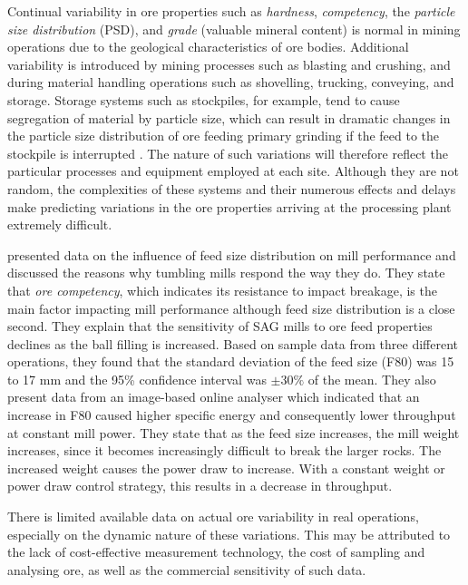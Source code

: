 Continual variability in ore properties such as \textit{hardness}, \textit{competency}, the \textit{particle size distribution} (PSD), and \textit{grade} (valuable mineral content) is normal in mining operations due to the geological characteristics of ore bodies. Additional variability is introduced by mining processes such as blasting and crushing, and during material handling operations such as shovelling, trucking, conveying, and storage. Storage systems such as stockpiles, for example, tend to cause segregation of material by particle size, which can result in dramatic changes in the particle size distribution of ore feeding primary grinding if the feed to the stockpile is interrupted \citep{estrada_hybrid_2014}. The nature of such variations will therefore reflect the particular processes and equipment employed at each site. Although they are not random, the complexities of these systems and their numerous effects and delays make predicting variations in the ore properties arriving at the processing plant extremely difficult.

\cite{morrell_influence_2001} presented data on the influence of feed size distribution on mill performance and discussed the reasons why tumbling mills respond the way they do. They state that \textit{ore competency}, which indicates its resistance to impact breakage, is the main factor impacting mill performance although feed size distribution is a close second. They explain that the sensitivity of \gls{SAG} mills to ore feed properties declines as the ball filling is increased. Based on sample data from three different operations, they found that the standard deviation of the feed size (F80) was 15 to 17 mm and the 95\% confidence interval was $\pm30\text{\%}$ of the mean. They also present data from an image-based online analyser which indicated that an increase in F80 caused higher specific energy and consequently lower throughput at constant mill power. They state that as the feed size increases, the mill weight increases, since it becomes increasingly difficult to break the larger rocks. The increased weight causes the power draw to increase. With a constant weight or power draw control strategy, this results in a decrease in throughput.

There is limited available data on actual ore variability in real operations, especially on the dynamic nature of these variations. This may be attributed to the lack of cost-effective measurement technology, the cost of sampling and analysing ore, as well as the commercial sensitivity of such data.

